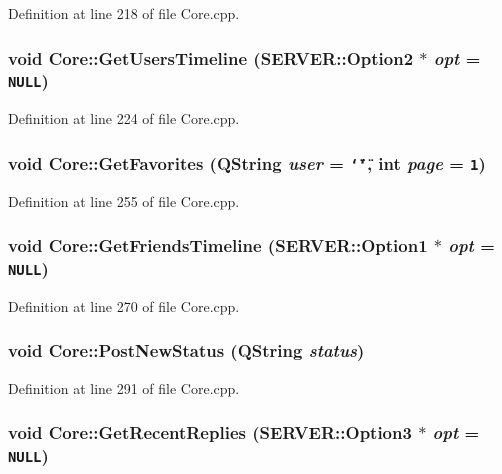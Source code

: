 Definition at line 218 of file Core.cpp.\hypertarget{classCore_7308eb02f04bd6da071db62f291c9def}{
\subsubsection{\setlength{\rightskip}{0pt plus 5cm}void Core::GetUsersTimeline ({\bf SERVER::Option2} $\ast$ {\em opt} = {\tt NULL})}}
\label{classCore_7308eb02f04bd6da071db62f291c9def}




Definition at line 224 of file Core.cpp.\hypertarget{classCore_a896aea28b564e4841df4cf527fb0247}{
\subsubsection{\setlength{\rightskip}{0pt plus 5cm}void Core::GetFavorites (QString {\em user} = {\tt \char`\"{}\char`\"{}}, \/  int {\em page} = {\tt 1})}}
\label{classCore_a896aea28b564e4841df4cf527fb0247}




Definition at line 255 of file Core.cpp.\hypertarget{classCore_bc64aa3de63d39a878db543d8d5df9f5}{
\subsubsection{\setlength{\rightskip}{0pt plus 5cm}void Core::GetFriendsTimeline ({\bf SERVER::Option1} $\ast$ {\em opt} = {\tt NULL})}}
\label{classCore_bc64aa3de63d39a878db543d8d5df9f5}




Definition at line 270 of file Core.cpp.\hypertarget{classCore_7023af805b629e90a7aa2978366ee344}{
\subsubsection{\setlength{\rightskip}{0pt plus 5cm}void Core::PostNewStatus (QString {\em status})}}
\label{classCore_7023af805b629e90a7aa2978366ee344}




Definition at line 291 of file Core.cpp.\hypertarget{classCore_b95dc3fca63c84496f6a487d845e7ba9}{
\subsubsection{\setlength{\rightskip}{0pt plus 5cm}void Core::GetRecentReplies ({\bf SERVER::Option3} $\ast$ {\em opt} = {\tt NULL})}}
\label{classCore_b95dc3fca63c84496f6a487d845e7ba9}




